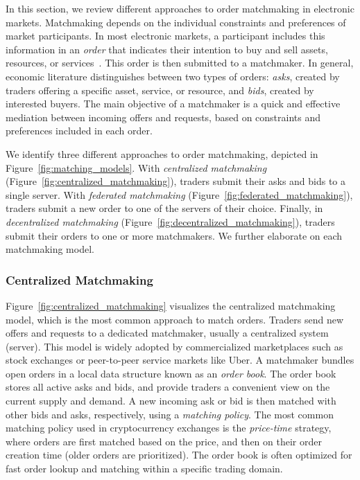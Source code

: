 In this section, we review different approaches to order matchmaking in electronic markets.
Matchmaking depends on the individual constraints and preferences of market participants.
In most electronic markets, a participant includes this information in an \emph{order} that indicates their intention to buy and sell assets, resources, or services~\cite{Veit:2003fs}.
This order is then submitted to a matchmaker.
In general, economic literature distinguishes between two types of orders: \emph{asks}, created by traders offering a specific asset, service, or resource, and \emph{bids}, created by interested buyers.
The main objective of a matchmaker is a quick and effective mediation between incoming offers and requests, based on constraints and preferences included in each order.

We identify three different approaches to order matchmaking, depicted in Figure~\ref{fig:matching_models}.
With \emph{centralized matchmaking} (Figure~\ref{fig:centralized_matchmaking}), traders submit their asks and bids to a single server.
With \emph{federated matchmaking} (Figure~\ref{fig:federated_matchmaking}), traders submit a new order to one of the servers of their choice.
Finally, in \emph{decentralized matchmaking} (Figure~\ref{fig:decentralized_matchmaking}), traders submit their orders to one or more matchmakers.
We further elaborate on each matchmaking model.

\subsubsection{Centralized Matchmaking}
Figure~\ref{fig:centralized_matchmaking} visualizes the centralized matchmaking model, which is the most common approach to match orders.
Traders send new offers and requests to a dedicated matchmaker, usually a centralized system (server).
This model is widely adopted by commercialized marketplaces such as stock exchanges or peer-to-peer service markets like Uber.
A matchmaker bundles open orders in a local data structure known as an \emph{order book}.
The order book stores all active asks and bids, and provide traders a convenient view on the current supply and demand.
A new incoming ask or bid is then matched with other bids and asks, respectively, using a \emph{matching policy}.
The most common matching policy used in cryptocurrency exchanges is the \emph{price-time} strategy, where orders are first matched based on the price, and then on their order creation time (older orders are prioritized).
The order book is often optimized for fast order lookup and matching within a specific trading domain.

